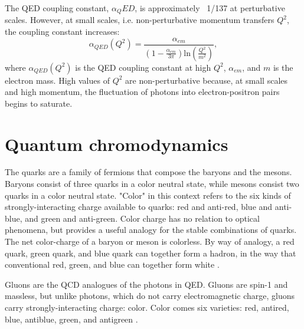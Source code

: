 The QED coupling constant, $\alpha_QED$, is approximately ~1/137 at perturbative scales. However, at small scales, i.e. non-perturbative momentum transfers $Q^2$, the coupling constant increases:
\begin{equation}
\alpha_{QED}(Q^2) = \frac{ \alpha_{em}}{(1 - \frac{\alpha_{em}}{3\pi})\mathrm{ln}(\frac{Q^2}{m^2}) },
\end{equation}
where $\alpha_{QED}(Q^2)$ is the QED coupling constant at high $Q^2$, $\alpha_{em}$, and $m$ is the electron mass. High values of $Q^2$ are non-perturbative because, at small scales and high momentum, the fluctuation of photons into electron-positron pairs begins to saturate.

\section{Quantum chromodynamics}

The quarks are a family of fermions that compose the baryons and the mesons. Baryons consist of three quarks in a color neutral state, while mesons consist two quarks in a color neutral state. "Color" in this context refers to the six kinds of strongly-interacting charge available to quarks: red and anti-red, blue and anti-blue, and green and anti-green. Color charge has no relation to optical phenomena, but provides a useful analogy for the stable combinations of quarks. The net color-charge of a baryon or meson is colorless. By way of analogy, a red quark, green quark, and blue quark can together form a hadron, in the way that conventional red, green, and blue can together form white \cite{Brock:1993sz}. 

Gluons are the QCD analogues of the photons in QED. Gluons are spin-1 and massless, but unlike photons, which do not carry electromagnetic charge, gluons carry strongly-interacting charge: color. Color comes six varieties: red, antired, blue, antiblue, green, and antigreen \cite{Wilczek:2000ih}. 


